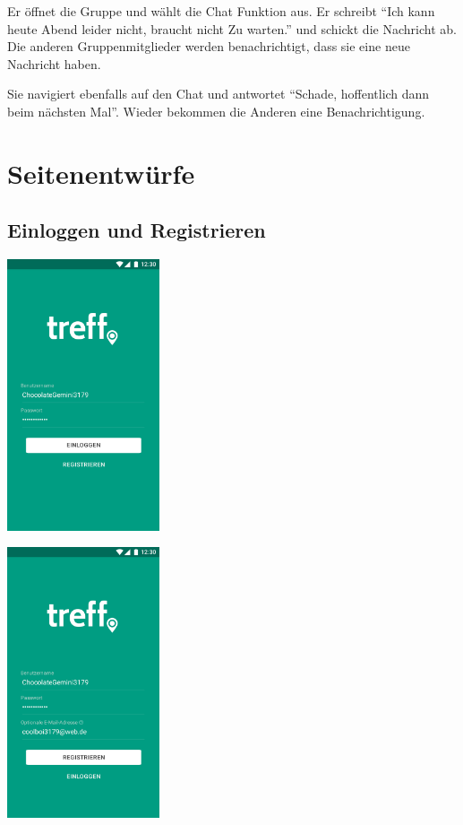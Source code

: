 \documentclass[parskip=full,11pt]{scrartcl}
\begin{document}
{Er öffnet die Gruppe und wählt die Chat Funktion aus. Er schreibt \enquote{Ich kann heute Abend leider nicht, braucht nicht Zu warten.} und schickt die Nachricht ab.}
{Die anderen Gruppenmitglieder werden benachrichtigt, dass sie eine neue Nachricht haben.}

{Sie navigiert ebenfalls auf den Chat und antwortet \enquote{Schade, hoffentlich dann beim
nächsten Mal}.}
{Wieder bekommen die Anderen eine Benachrichtigung.}


\pagebreak
\appendix

\section{Seitenentwürfe}

\subsection{Einloggen und Registrieren}
\begin{minipage}{0.4\textwidth}
\includegraphics[width = 45mm]{mockups/login.png}
\end{minipage}
\begin{minipage}{0.4\textwidth}
\includegraphics[width = 45mm]{mockups/register.png}
\end{minipage}
\end{document}

